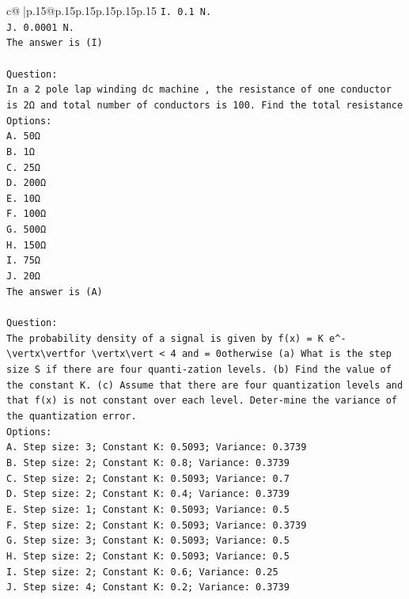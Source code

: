 \documentclass{article}
\begin{document}
{\begin{supertabular}{c@{$\;$}|p{.15\linewidth}@{}p{.15\linewidth}p{.15\linewidth}p{.15\linewidth}p{.15\linewidth}p{.15\linewidth}}
{{{\texttt{I. 0.1 N.} \\
\texttt{J. 0.0001 N.} \\
\texttt{The answer is (I)} \\
\\ 
\texttt{Question:} \\
\texttt{In a 2 pole lap winding dc machine , the resistance of one conductor is 2Ω and total number of conductors is 100. Find the total resistance} \\
\texttt{Options:} \\
\texttt{A. 50Ω} \\
\texttt{B. 1Ω} \\
\texttt{C. 25Ω} \\
\texttt{D. 200Ω} \\
\texttt{E. 10Ω} \\
\texttt{F. 100Ω} \\
\texttt{G. 500Ω} \\
\texttt{H. 150Ω} \\
\texttt{I. 75Ω} \\
\texttt{J. 20Ω} \\
\texttt{The answer is (A)} \\
\\ 
\texttt{Question:} \\
\texttt{The probability density of a signal is given by f(x) = K e\^{}{-}\textbackslash{}vertx\textbackslash{}vertfor \textbackslash{}vertx\textbackslash{}vert < 4 and = 0otherwise (a) What is the step size S if there are four quanti{-}zation levels. (b) Find the value of the constant K. (c) Assume that there are four quantization levels and that f(x) is not constant over each level. Deter{-}mine the variance of the quantization error.} \\
\texttt{Options:} \\
\texttt{A. Step size: 3; Constant K: 0.5093; Variance: 0.3739} \\
\texttt{B. Step size: 2; Constant K: 0.8; Variance: 0.3739} \\
\texttt{C. Step size: 2; Constant K: 0.5093; Variance: 0.7} \\
\texttt{D. Step size: 2; Constant K: 0.4; Variance: 0.3739} \\
\texttt{E. Step size: 1; Constant K: 0.5093; Variance: 0.5} \\
\texttt{F. Step size: 2; Constant K: 0.5093; Variance: 0.3739} \\
\texttt{G. Step size: 3; Constant K: 0.5093; Variance: 0.5} \\
\texttt{H. Step size: 2; Constant K: 0.5093; Variance: 0.5} \\
\texttt{I. Step size: 2; Constant K: 0.6; Variance: 0.25} \\
\texttt{J. Step size: 4; Constant K: 0.2; Variance: 0.3739} \\
            }
        }
    }
     \\ \\


\end{supertabular}}
\end{document}
